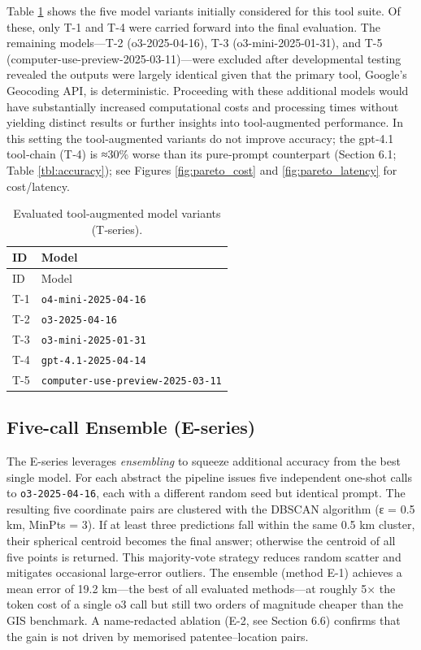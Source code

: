 Table \ref{tbl:tmodels} shows the five model variants initially
considered for this tool suite. Of these, only T-1 and T-4 were carried
forward into the final evaluation. The remaining models---T-2
(o3-2025-04-16), T-3 (o3-mini-2025-01-31), and T-5
(computer-use-preview-2025-03-11)---were excluded after developmental
testing revealed the outputs were largely identical given that the
primary tool, Google's Geocoding API, is deterministic. Proceeding with
these additional models would have substantially increased computational
costs and processing times without yielding distinct results or further
insights into tool-augmented performance. In this setting the
tool‑augmented variants do not improve accuracy; the gpt‑4.1 tool‑chain
(T‑4) is ≈30\% worse than its pure‑prompt counterpart (Section 6.1;
Table \ref{tbl:accuracy}); see Figures \ref{fig:pareto_cost} and
\ref{fig:pareto_latency} for cost/latency.

\begin{longtable}[]{@{}ll@{}}
\caption{\label{tbl:tmodels}Evaluated tool‑augmented model variants
(T‑series).}\tabularnewline
\toprule\noalign{}
ID & Model \\
\midrule\noalign{}
\endfirsthead
\toprule\noalign{}
ID & Model \\
\midrule\noalign{}
\endhead
\bottomrule\noalign{}
\endlastfoot
T-1 & \passthrough{\lstinline!o4-mini-2025-04-16!} \\
T-2 & \passthrough{\lstinline!o3-2025-04-16!} \\
T-3 & \passthrough{\lstinline!o3-mini-2025-01-31!} \\
T-4 & \passthrough{\lstinline!gpt-4.1-2025-04-14!} \\
T-5 & \passthrough{\lstinline!computer-use-preview-2025-03-11!} \\
\end{longtable}

\subsection{Five-call Ensemble
(E-series)}\label{five-call-ensemble-e-series}

The E-series leverages \emph{ensembling} to squeeze additional accuracy
from the best single model. For each abstract the pipeline issues five
independent one-shot calls to \passthrough{\lstinline!o3-2025-04-16!},
each with a different random seed but identical prompt. The resulting
five coordinate pairs are clustered with the DBSCAN algorithm (ε = 0.5
km, MinPts = 3). If at least three predictions fall within the same 0.5
km cluster, their spherical centroid becomes the final answer; otherwise
the centroid of all five points is returned. This majority-vote strategy
reduces random scatter and mitigates occasional large-error outliers.
The ensemble (method E-1) achieves a mean error of 19.2 km---the best of
all evaluated methods---at roughly 5× the token cost of a single o3 call
but still two orders of magnitude cheaper than the GIS benchmark. A
name-redacted ablation (E-2, see Section 6.6) confirms that the gain is
not driven by memorised patentee--location pairs.

